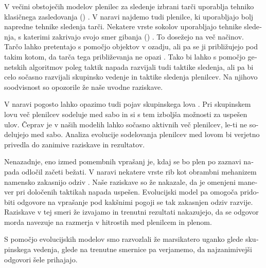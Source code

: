 \begin{slovenian}
V večini obstoječih modelov \cite{demsar2014simulated,demsar2015simulating,demsar2016balanced,demsar2017evolution,nishimura2002predator,zheng2005behavior} plenilec za sledenje izbrani tarči uporablja tehniko klasičnega zasledovanja () \cite{nahin2012chases}. V naravi najdemo tudi plenilce, ki uporabljajo bolj napredne tehnike sledenja tarči. Nekatere vrste sokolov uporabljajo tehnike sledenja, s katerimi zakrivajo svojo smer gibanja () \cite{kane2014falcons}. To dosežejo na več načinov. Tarčo lahko pretentajo s pomočjo objektov v ozadju, ali pa se ji približujejo pod takim kotom, da tarča tega približevanja ne opazi \cite{justh2006steering}. Tako bi lahko s pomočjo genetskih algoritmov poleg taktik napada razvijali tudi taktike sledenja, ali pa bi celo sočasno razvijali skupinsko vedenje in taktike sledenja plenilcev. Na njihovo soodvisnost so opozorile že naše uvodne raziskave.

V naravi pogosto lahko opazimo tudi pojav skupinskega lova \cite{creel1995communal,escobedo2014groupsize,fanshawe1993factors,lett2004continuous,muro2011wolfpack,packer1988evolution,scheel1991group}. Pri skupinskem lovu več plenilcev sodeluje med sabo in si s tem izboljša možnosti za uspešen ulov. Čeprav je v naših modelih lahko sočasno aktivnih več plenilcev, le-ti ne sodelujejo med sabo. Analiza evolucije sodelovanja plenilcev med lovom bi verjetno privedla do zanimive raziskave in rezultatov.

Nenazadnje, eno izmed pomembnih vprašanj je, kdaj se bo plen po zaznavi napada odločil začeti bežati. V naravi nekatere vrste rib kot obrambni mehanizem namensko zakasnijo odziv \cite{partridge1982structure}. Naše raziskave so že nakazale, da je omenjeni manever pri določenih taktikah napada uspešen. Evolucijski model pa omogoča pridobiti odgovore na vprašanje pod kakšnimi pogoji se tak zakasnjen odziv razvije. Raziskave v tej smeri že izvajamo in trenutni rezultati nakazujejo, da se odgovor morda navezuje na razmerja v hitrostih med plenilcem in plenom.

S pomočjo evolucijskih modelov smo razvozlali že marsikatero uganko glede skupinskega vedenja, glede na trenutne smernice pa verjamemo, da najzanimivejši odgovori šele prihajajo.

\end{slovenian}
